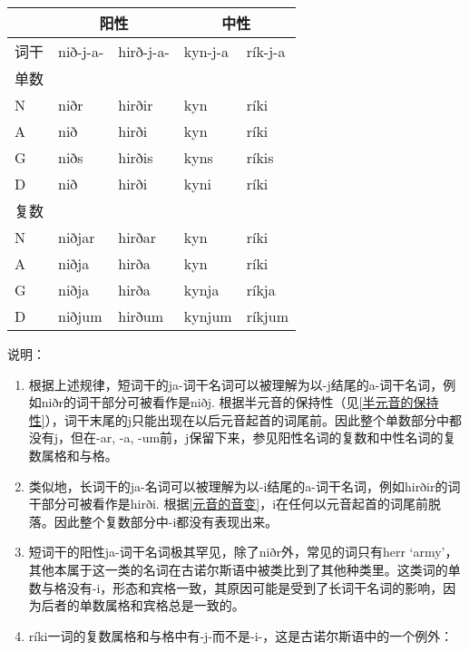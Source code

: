 \begin{longtable}{lllll}
  \toprule
     & \multicolumn{2}{c}{阳性} & \multicolumn{2}{c}{中性}                     \\
  \midrule
  \endhead
  \bottomrule
  \endfoot
  词干 & nið-j-a-               & hirð-j-a-              & kyn-j-a & rík-j-a \\
  单数 &                        &                        &         &         \\
  N  & niðr                   & hirðir                 & kyn     & ríki    \\
  A  & nið                    & hirði                  & kyn     & ríki    \\
  G  & niðs                   & hirðis                 & kyns    & ríkis   \\
  D  & nið                    & hirði                  & kyni    & ríki    \\
  复数 &                        &                        &         &         \\
  N  & niðjar                 & hirðar                 & kyn     & ríki    \\
  A  & niðja                  & hirða                  & kyn     & ríki    \\
  G  & niðja                  & hirða                  & kynja   & ríkja   \\
  D  & niðjum                 & hirðum                 & kynjum  & ríkjum  \\
\end{longtable}

说明：

\begin{enumerate}
  \def\labelenumi{\arabic{enumi})}
  \item
        根据上述规律，短词干的ja-词干名词可以被理解为以-j结尾的a-词干名词，例如niðr的词干部分可被看作是niðj.
        根据半元音的保持性（见\ref{半元音的保持性}），词干末尾的j只能出现在以后元音起首的词尾前。因此整个单数部分中都没有j，但在-ar,
        -a, -um前，j保留下来，参见阳性名词的复数和中性名词的复数属格和与格。
  \item
        类似地，长词干的ja-名词可以被理解为以-i结尾的a-词干名词，例如hirðir的词干部分可被看作是hirði.
        根据\ref{元音的音变}，i在任何以元音起首的词尾前脱落。因此整个复数部分中-i都没有表现出来。
  \item
        短词干的阳性ja-词干名词极其罕见，除了niðr外，常见的词只有herr
        `army'，其他本属于这一类的名词在古诺尔斯语中被类比到了其他种类里。这类词的单数与格没有-i，形态和宾格一致，其原因可能是受到了长词干名词的影响，因为后者的单数属格和宾格总是一致的。
  \item
        ríki一词的复数属格和与格中有-j-而不是-i-，这是古诺尔斯语中的一个例外：
\end{enumerate}

